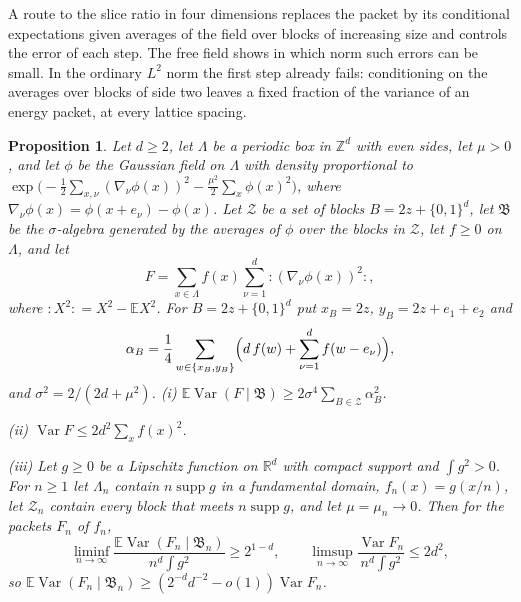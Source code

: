 \documentclass[11pt]{amsart}
\newtheorem{proposition}[theorem]{Proposition}
\theoremstyle{definition}
\theoremstyle{remark}
\numberwithin{equation}{section}
\newcommand{\R}{\mathbb{R}}
\newcommand{\Z}{\mathbb{Z}}
\newcommand{\E}{\mathbb{E}}
\newcommand{\Var}{\operatorname{Var}}
\begin{document}
A route to the slice ratio in four dimensions replaces the packet by its
conditional expectations given averages of the field over blocks of
increasing size and controls the error of each step. The free field shows in
which norm such errors can be small. In the ordinary $L^2$ norm the first
step already fails: conditioning on the averages over blocks of side two
leaves a fixed fraction of the variance of an energy packet, at every
lattice spacing.

\begin{proposition}\label{prop:blockfree}
Let $d\ge2$, let $\Lambda$ be a periodic box in $\Z^d$ with even sides, let
$\mu>0$, and let $\phi$ be the Gaussian field on $\Lambda$ with density
proportional to
$\exp\bigl(-\frac12\sum_{x,\nu}(\nabla_\nu\phi(x))^2-\frac{\mu^2}2\sum_x
\phi(x)^2\bigr)$, where $\nabla_\nu\phi(x)=\phi(x+e_\nu)-\phi(x)$. Let
$\mathcal Z$ be a set of blocks $B=2z+\{0,1\}^d$, let $\mathfrak B$ be the
$\sigma$-algebra generated by the averages of $\phi$ over the blocks in
$\mathcal Z$, let $f\ge0$ on $\Lambda$, and let
\[
F=\sum_{x\in\Lambda}f(x)\sum_{\nu=1}^d{:}(\nabla_\nu\phi(x))^2{:} ,
\]
where ${:}X^2{:}=X^2-\E X^2$. For $B=2z+\{0,1\}^d$ put $x_B=2z$,
$y_B=2z+e_1+e_2$ and
\[
\alpha_B=\frac14\sum_{w\in\{x_B,y_B\}}\Bigl(d\,f(w)+\sum_{\nu=1}^df(w-e_\nu)
\Bigr),
\]
and $\sigma^2=2/(2d+\mu^2)$.
\textup{(i)} $\E\Var(F\mid\mathfrak B)\ge2\sigma^4\sum_{B\in\mathcal Z}\alpha_B^2$.

\textup{(ii)} $\Var F\le2d^2\sum_xf(x)^2$.

\textup{(iii)} Let $g\ge0$ be a Lipschitz function on $\R^d$ with compact
support and $\int g^2>0$. For $n\ge1$ let $\Lambda_n$ contain $n\operatorname{supp}g$
in a fundamental domain, $f_n(x)=g(x/n)$, let $\mathcal Z_n$ contain every
block that meets $n\operatorname{supp}g$, and let $\mu=\mu_n\to0$. Then for
the packets $F_n$ of $f_n$,
\[
\liminf_{n\to\infty}\frac{\E\Var(F_n\mid\mathfrak B_n)}{n^d\int g^2}
\ge2^{1-d},\qquad
\limsup_{n\to\infty}\frac{\Var F_n}{n^d\int g^2}\le2d^2 ,
\]
so $\E\Var(F_n\mid\mathfrak B_n)\ge(2^{-d}d^{-2}-o(1))\Var F_n$.
\end{proposition}
\end{document}

